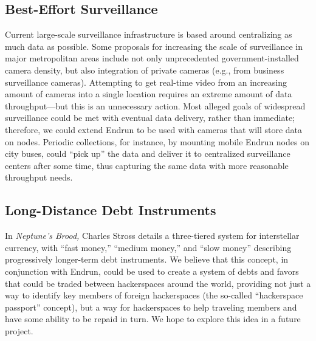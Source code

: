 \documentclass[12pt]{article}
\begin{document}
  \subsection{Best-Effort Surveillance}
  
  Current large-scale surveillance infrastructure is based around centralizing as much data as possible. Some proposals for increasing the scale of surveillance in major metropolitan areas include not only unprecedented government-installed camera density, but also integration of private cameras (e.g., from business surveillance cameras). Attempting to get real-time video from an increasing amount of cameras into a single location requires an extreme amount of data throughput---but this is an unnecessary action. Most alleged goals of widespread surveillance could be met with eventual data delivery, rather than immediate; therefore, we could extend Endrun to be used with cameras that will store data on nodes. Periodic collections, for instance, by mounting mobile Endrun nodes on city buses, could ``pick up'' the data and deliver it to centralized surveillance centers after some time, thus capturing the same data with more reasonable throughput needs.
  
  \subsection{Long-Distance Debt Instruments}
  
  In \emph{Neptune's Brood,} Charles Stross details a three-tiered system for interstellar currency, with ``fast money,'' ``medium money,'' and ``slow money'' describing progressively longer-term debt instruments. We believe that this concept, in conjunction with Endrun, could be used to create a system of debts and favors that could be traded between hackerspaces around the world, providing not just a way to identify key members of foreign hackerspaces (the so-called ``hackerspace passport'' concept), but a way for hackerspaces to help traveling members and have some ability to be repaid in turn. We hope to explore this idea in a future project.
\end{document}
